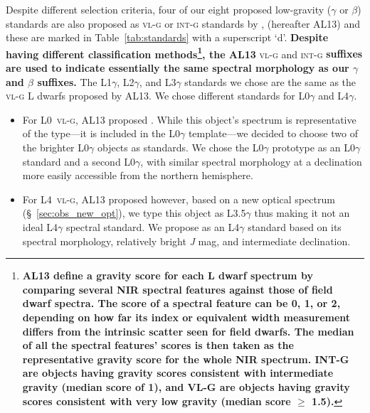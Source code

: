 \documentclass[12pt]{aastex6}
\begin{document}
Despite different selection criteria, four of our eight proposed low-gravity ($\gamma$ or $\beta$) standards are also proposed as \textsc{vl-g} or \textsc{int-g} standards by \citet{Allers:2013hk}, (hereafter AL13) and these are marked in Table~\ref{tab:standards} with a superscript `d'.
\textbf{Despite having different classification methods\footnote{\textbf{AL13 define a gravity score for each L dwarf spectrum by comparing several NIR spectral features against those of field dwarf spectra. The score of a spectral feature can be 0, 1, or 2, depending on how far its index or equivalent width measurement differs from the intrinsic scatter seen for field dwarfs. The median of all the spectral features' scores is then taken as the representative gravity score for the whole NIR spectrum. INT-G are objects having gravity scores consistent with intermediate gravity (median score of 1), and VL-G are objects having gravity scores consistent with very low gravity (median score $\geq$ 1.5).}}, the AL13} \textsc{vl-g} and \textsc{int-g} \textbf{suffixes are used to indicate essentially the same spectral morphology as our $\gamma$ and $\beta$ suffixes.}
The L1$\gamma$, L2$\gamma$, and L3$\gamma$ standards we chose are the same as the \textsc{vl-g} L dwarfs proposed by AL13.
We chose different standards for L0$\gamma$ and L4$\gamma$.
\begin{itemize}

  \item For L0~\textsc{vl-g}, AL13 proposed . While this object's spectrum is representative of the type---it is included in the L0$\gamma$ template---we decided to choose two of the brighter L0$\gamma$ objects as standards. We chose the L0$\gamma$ prototype  as an L0$\gamma$ standard and a second L0$\gamma$,  with similar spectral morphology at a declination more easily accessible from the northern hemisphere.

  \item For L4~\textsc{vl-g}, AL13 proposed  however, based on a new optical spectrum (\S~\ref{sec:obs_new_opt}), we type this object as L3.5$\gamma$ thus making it not an ideal L4$\gamma$ spectral standard.
  We propose  as an L4$\gamma$ standard based on its spectral morphology, relatively bright \emph{J} mag, and intermediate declination.

\end{itemize}
\end{document}
